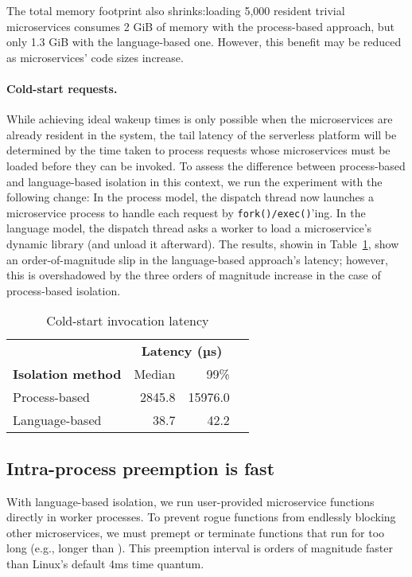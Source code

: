 The total memory footprint also shrinks:\@ loading 5,000 resident
trivial microservices consumes 2 GiB of memory with the process-based approach, but
only 1.3 GiB with the language-based one.  However, this benefit may be reduced as
microservices' code sizes increase.

\paragraph{Cold-start requests.}
While achieving ideal wakeup times is only possible when the microservices are
already resident in the system, the tail latency of the serverless platform will be
determined by the time taken to process requests whose microservices must be loaded
before they can be invoked.  To assess the difference between process-based and
language-based isolation in this context, we run the experiment with the following
change:  In the process model, the dispatch thread now launches a microservice
process to handle each request by \texttt{fork()/exec()}'ing.  In the language model,
the dispatch thread asks a worker to load a microservice's dynamic library (and
unload it afterward).  The results, showin in Table~\ref{tab:cold_start}, show an
order-of-magnitude slip in the language-based approach's latency; however, this is
overshadowed by the three orders of magnitude increase in the case of process-based
isolation.

\begin{table}
\begin{center}
\small
\begin{tabular}{lrrr}
   & \multicolumn{2}{c}{\textbf{Latency (µs)}} \\
  \textbf{Isolation method} & Median & 99\% \\
\midrule
Process-based & 2845.8 & 15976.0 \\
Language-based & 38.7 & 42.2 \\
\end{tabular}
\caption{Cold-start invocation latency}
\label{tab:cold_start}
\end{center}
\end{table}

\subsection{Intra-process preemption is fast}
With language-based isolation, we run user-provided microservice functions
directly in worker processes. To prevent rogue functions from endlessly blocking
other microservices, we must premept or terminate functions that run for too
long (e.g., longer than ).  This preemption interval is orders of
magnitude faster than Linux's default 4ms time quantum.

